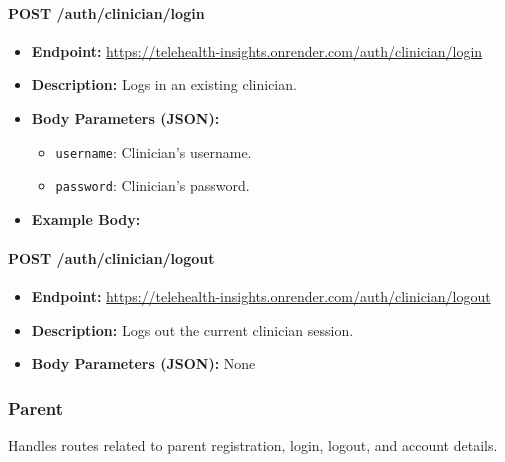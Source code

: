 \documentclass{article}
\begin{document}
\paragraph{POST /auth/clinician/login}
\begin{itemize}
    \item \textbf{Endpoint:} 
        \url{https://telehealth-insights.onrender.com/auth/clinician/login}
    \item \textbf{Description:} Logs in an existing clinician.
    \item \textbf{Body Parameters (JSON):}
    \begin{itemize}
        \item \texttt{username}: Clinician’s username.
        \item \texttt{password}: Clinician’s password.
    \end{itemize}
    \item \textbf{Example Body:}
\end{itemize}

\paragraph{POST /auth/clinician/logout}
\begin{itemize}
    \item \textbf{Endpoint:} 
        \url{https://telehealth-insights.onrender.com/auth/clinician/logout}
    \item \textbf{Description:} Logs out the current clinician session.
    \item \textbf{Body Parameters (JSON):} None
\end{itemize}

\subsubsection{Parent}
Handles routes related to parent registration, login, logout, and account details.
\end{document}
